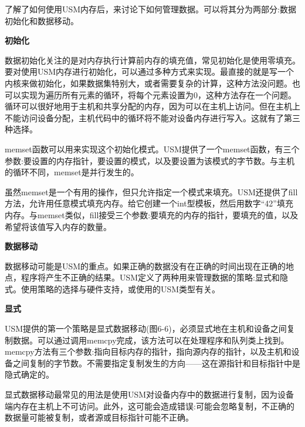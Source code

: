 了解了如何使用USM内存后，来讨论下如何管理数据。可以将其分为两部分:数据初始化和数据移动。\par

\hspace*{\fill} \par %
\textbf{初始化}

数据初始化关注的是对内存执行计算前内存的填充值，常见初始化是使用零填充。要对使用USM内存进行初始化，可以通过多种方式来实现。最直接的就是写一个内核来做初始化，如果数据集特别大，或者需要复杂的计算，这种方法没问题。也可以实现为遍历所有元素的循环，将每个元素设置为0，这种方法存在一个问题。循环可以很好地用于主机和共享分配的内存，因为可以在主机上访问。但在主机上不能访问设备分配，主机代码中的循环将不能对设备内存进行写入。这就有了第三种选择。\par

memset函数可以用来实现这个初始化模式。USM提供了一个memset函数，有三个参数:要设置的内存指针，要设置的模式，以及要设置为该模式的字节数。与主机的循环不同，memset是并行发生的。\par

虽然memset是一个有用的操作，但只允许指定一个模式来填充。USM还提供了fill方法，允许用任意模式填充内存。给它创建一个int型模板，然后用数字“42”填充内存。与memset类似，fill接受三个参数:要填充的内存的指针，要填充的值，以及希望将该值写入内存的数量。\par

\hspace*{\fill} \par %
\textbf{数据移动}

数据移动可能是USM的重点。如果正确的数据没有在正确的时间出现在正确的地点，程序将产生不正确的结果。USM定义了两种用来管理数据的策略:显式和隐式。使用策略的选择与硬件支持，或使用的USM类型有关。\par

\hspace*{\fill} \par %
\textbf{显式}

USM提供的第一个策略是显式数据移动(图6-6)，必须显式地在主机和设备之间复制数据。可以通过调用memcpy完成，该方法可以在处理程序和队列类上找到。memcpy方法有三个参数:指向目标内存的指针，指向源内存的指针，以及主机和设备之间复制的字节数。不需要指定复制发生的方向——这在源指针和目标指针中是隐式确定的。\par

显式数据移动最常见的用法是使用USM对设备内存中的数据进行复制，因为设备端内存在主机上不可访问。此外，这可能会造成错误:可能会忽略复制，不正确的数据量可能被复制，或者源或目标指针可能不正确。\par


